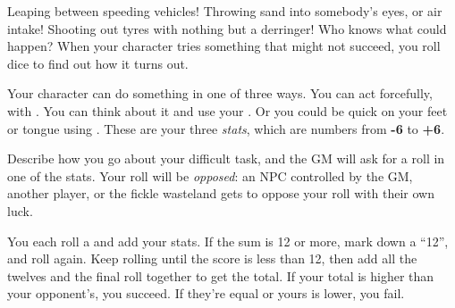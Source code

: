 
Leaping between speeding vehicles! Throwing sand into somebody's eyes, or air intake! Shooting out tyres with nothing but a derringer! Who knows what could happen? When your character tries something that might not succeed, you roll dice to find out how it turns out.

Your character can do something in one of three ways. You can act forcefully, with . You can think about it and use your . Or you could be quick on your feet or tongue using . These are your three \emph{stats}, which are numbers from \textbf{-6} to \textbf{+6}.

Describe how you go about your difficult task, and the GM will ask for a roll in one of the stats. Your roll will be \emph{opposed}: an NPC controlled by the GM, another player, or the fickle wasteland gets to oppose your roll with their own luck.

You each roll a  and add your stats. If the sum is 12 or more, mark down a ``12'', and roll again. Keep rolling until the score is less than 12, then add all the twelves and the final roll together to get the total. If your total is higher than your opponent's, you succeed. If they're equal or yours is lower, you fail.
